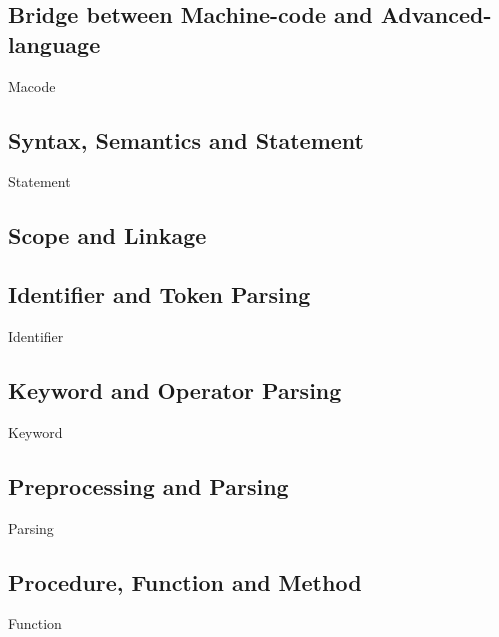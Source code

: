 

\subsection{Bridge between Machine-code and Advanced-language}

{Macode}



\subsection{Syntax, Semantics and Statement}

{Statement}



\subsection{Scope and Linkage}



\subsection{Identifier and Token Parsing}

{Identifier}



\subsection{Keyword and Operator Parsing}

{Keyword}





\subsection{Preprocessing and Parsing}

{Parsing}



\subsection{Procedure, Function and Method}


{Function}



